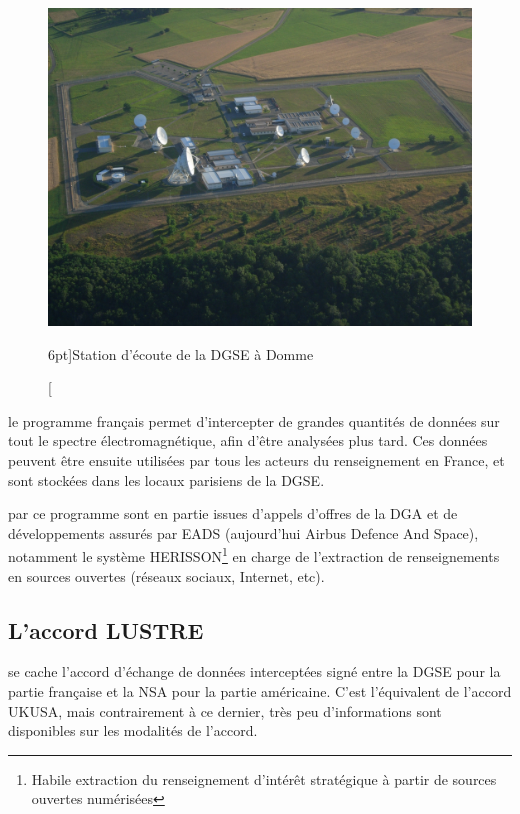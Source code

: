 \vspace{0.7cm}
\begin{figure}
\includegraphics{french1.jpg}
\caption[Station d'écoute de Domme][6pt]{Station d'écoute de la DGSE
à Domme}
\label{fig:french1}
\end{figure}


 le programme français permet d'intercepter de
grandes quantités de données sur tout le spectre électromagnétique, afin d'être
analysées plus tard. Ces données peuvent être ensuite utilisées par tous les
acteurs du renseignement en France, et sont stockées dans les locaux parisiens
de la DGSE.\autocite{bbf}

 par ce programme sont en partie issues
d'appels d'offres de la DGA et de développements assurés par EADS (aujourd'hui
Airbus Defence And Space), notamment le système HERISSON\footnote{Habile
extraction du renseignement d'intérêt stratégique à partir de sources ouvertes
numérisées}\autocite{herisson} en charge de l'extraction de renseignements en
sources ouvertes (réseaux sociaux, Internet, etc).

\newpage
\subsection{L'accord LUSTRE}

 se cache l'accord d'échange de données
interceptées signé entre la DGSE pour la partie française et la NSA pour la
partie américaine. C'est l'équivalent de l'accord UKUSA, mais contrairement à ce
dernier, très peu d'informations sont disponibles sur les modalités de l'accord.

